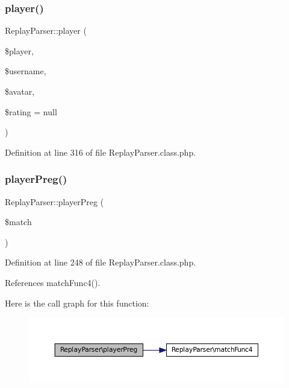 \subsubsection{\texorpdfstring{player()}{player()}}
{\footnotesize\ttfamily Replay\+Parser\+::player (\begin{DoxyParamCaption}\item[{}]{\$player,  }\item[{}]{\$username,  }\item[{}]{\$avatar,  }\item[{}]{\$rating = {\ttfamily null} }\end{DoxyParamCaption})}



Definition at line 316 of file Replay\+Parser.\+class.\+php.

\mbox{\label{class_replay_parser_aaf806767f8ce5255033e5f3a23498d07}} 
\subsubsection{\texorpdfstring{player\+Preg()}{playerPreg()}}
{\footnotesize\ttfamily Replay\+Parser\+::player\+Preg (\begin{DoxyParamCaption}\item[{}]{\$match }\end{DoxyParamCaption})}



Definition at line 248 of file Replay\+Parser.\+class.\+php.



References match\+Func4().

Here is the call graph for this function\+:\nopagebreak
\begin{figure}[H]
\begin{center}
\leavevmode
\includegraphics[width=350pt]{class_replay_parser_aaf806767f8ce5255033e5f3a23498d07_cgraph}
\end{center}
\end{figure}
\mbox{\label{class_replay_parser_aedbd02d59b5048e0f558e234a2e28c24}} 
